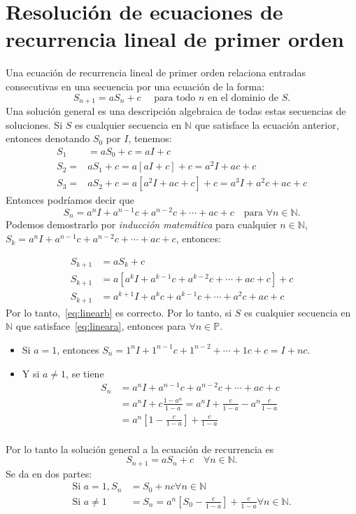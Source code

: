 \section{Resolución de ecuaciones de recurrencia lineal de primer orden}

Una ecuación de recurrencia lineal de primer orden relaciona entradas consecutivas en una secuencia por una ecuación de la forma:
\begin{equation}\label{eq:lineara}
S_{n+1}=a S_{n}+c\quad\text{ para todo }n\text{ en el dominio de } S.
\end{equation}
Una solución general es una descripción algebraica de todas estas secuencias de soluciones. Si $S$ es cualquier secuencia en $\mathds{N}$ que satisface la ecuación anterior, entonces denotando $S_{0}$ por $I$, tenemos:
\begin{align*}
S_1&=aS_0+c=aI+c \\
S_2=&aS_1+c=a[aI+c]+c=a^2I+ac+c \\
S_3=&aS_2+c=a[a^2I+ac+c]+c=a^3I+a^2c+ac+c
\end{align*}
Entonces podríamos decir que
\begin{equation}\label{eq:linearb}
S_n = a^nI+a^{n-1}c+a^{n-2}c +\cdots+ac+c\quad\text{para }\forall n\in\mathds{N}.
\end{equation}
Podemos demostrarlo por \emph{inducción matemática} para cualquier $n\in\mathds{N}$, $S_k=a^nI+a^{n-1}c+a^{n-2}c+\cdots+ac+c$, entonces:

\begin{align*}
S_{k+1}&=aS_{k} + c  \\
S_{k+1}&=a[a^kI+a^{k-1}c+a^{k-2}c+\cdots+ac+c] + c\\
S_{k+1}&=a^{k+1}I+a^k c+a^{k-1}c+\cdots+a^2c+ac+c
\end{align*}
Por lo tanto,~\eqref{eq:linearb} es correcto. Por lo tanto, si $S$ es cualquier secuencia en $\mathds{N}$ que satisface~\eqref{eq:lineara}, entonces para $\forall n\in \mathds{P}$.
\begin{itemize}
	\item Si $a=1$, entonces $S_n=1^nI+1^{n-1}c+1^{n-2}+\cdots+1c+c=I+nc$.
	\item Y si $a\neq1$, se tiene
	\begin{align*}
	S_n&=a^nI+a^{n-1}c+a^{n-2}c+\cdots+ac+c\\
	&=a^nI+c\frac{1-a^n}{1-a}=a^nI+\frac{c}{1-a}-a^n\frac{c}{1-a}\\
	&=a^n[1-\frac{c}{1-a}]+\frac{c}{1-a}\\
	\end{align*}
\end{itemize}
Por lo tanto la solución general a la ecuación de recurrencia es \[ S_{n+1} = aS_n+c\quad\forall n\in\mathds{N}. \] Se da en dos partes:
\begin{align*}
\text{Si }a=1, S_n&= S_0+ nc\forall n\in\mathds{N}\\
\text{Si }a\neq1&=S_n= a^n[S_0-\frac{c}{1-a}]+\frac{c}{1-a}\forall n\in\mathds{N}.
\end{align*}

